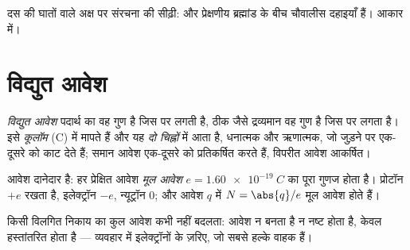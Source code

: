 \begin{omfigure}

{\small दस की घातों वाले अक्ष पर संरचना की सीढ़ी:  और
प्रेक्षणीय ब्रह्मांड के बीच चौवालीस दहाइयाँ हैं। आकार  में।}
\end{omfigure}

\section{विद्युत आवेश}

\begin{definition}[विद्युत आवेश]\label{def:g11:fundamental-interactions:charge}
\emph{विद्युत आवेश} पदार्थ का वह गुण है जिस पर
 लगती है, ठीक जैसे द्रव्यमान वह गुण है
जिस पर  लगता है। इसे \emph{कूलॉम} (\unit{C})
में मापते हैं और यह \emph{दो चिह्नों} में आता है, धनात्मक और ऋणात्मक, जो
जुड़ने पर एक-दूसरे को काट देते हैं; समान आवेश एक-दूसरे को प्रतिकर्षित करते
हैं, विपरीत आवेश आकर्षित।
\end{definition}

\begin{definition}[मूल आवेश]\label{def:g11:fundamental-interactions:elementary}
आवेश दानेदार है: हर प्रेक्षित आवेश \emph{मूल आवेश} $e = \qty{1.60e-19}{C}$ का
पूरा गुणज होता है। प्रोटॉन $+e$ रखता है, इलेक्ट्रॉन $-e$, न्यूट्रॉन
$0$; और आवेश $q$ में $N = \abs{q}/e$ मूल आवेश होते हैं।
\end{definition}

\begin{proposition}[आवेश का संरक्षण]\label{prop:g11:fundamental-interactions:conservation}
किसी विलगित निकाय का कुल आवेश कभी नहीं बदलता: आवेश न बनता है न नष्ट होता है,
केवल हस्तांतरित होता है --- व्यवहार में इलेक्ट्रॉनों के ज़रिए, जो सबसे हल्के
वाहक हैं।
\end{proposition}
\admitted

